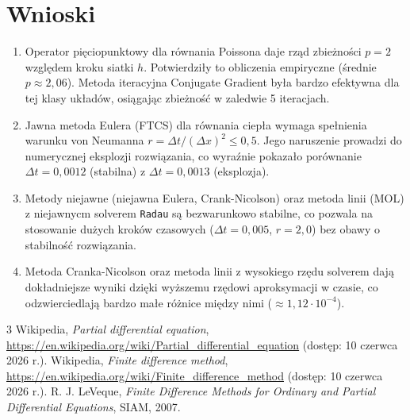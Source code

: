 \documentclass[12pt, a4paper]{article}
\begin{document}
\section{Wnioski}

\begin{enumerate}
  \item Operator pięciopunktowy dla równania Poissona daje rząd zbieżności $p = 2$ względem kroku siatki $h$. Potwierdziły to obliczenia empiryczne (średnie $p \approx 2{,}06$). Metoda iteracyjna Conjugate Gradient była bardzo efektywna dla tej klasy układów, osiągając zbieżność w zaledwie 5 iteracjach.

  \item Jawna metoda Eulera (FTCS) dla równania ciepła wymaga spełnienia warunku von Neumanna $r = \Delta t / (\Delta x)^2 \le 0{,}5$. Jego naruszenie prowadzi do numerycznej eksplozji rozwiązania, co wyraźnie pokazało porównanie $\Delta t = 0{,}0012$ (stabilna) z $\Delta t = 0{,}0013$ (eksplozja).

  \item Metody niejawne (niejawna Eulera, Crank-Nicolson) oraz metoda linii (MOL) z niejawnycm solverem \texttt{Radau} są bezwarunkowo stabilne, co pozwala na stosowanie dużych kroków czasowych ($\Delta t = 0{,}005$, $r = 2{,}0$) bez obawy o stabilność rozwiązania.

  \item Metoda Cranka-Nicolson oraz metoda linii z wysokiego rzędu solverem dają dokładniejsze wyniki dzięki wyższemu rzędowi aproksymacji w czasie, co odzwierciedlają bardzo małe różnice między nimi ($\approx 1{,}12 \cdot 10^{-4}$).
\end{enumerate}

\begin{thebibliography}{3}
  Wikipedia, \emph{Partial differential equation}, \url{https://en.wikipedia.org/wiki/Partial_differential_equation} (dostęp: 10 czerwca 2026 r.).
  Wikipedia, \emph{Finite difference method}, \url{https://en.wikipedia.org/wiki/Finite_difference_method} (dostęp: 10 czerwca 2026 r.).
  R. J. LeVeque, \emph{Finite Difference Methods for Ordinary and Partial Differential Equations}, SIAM, 2007.
\end{thebibliography}
\end{document}
